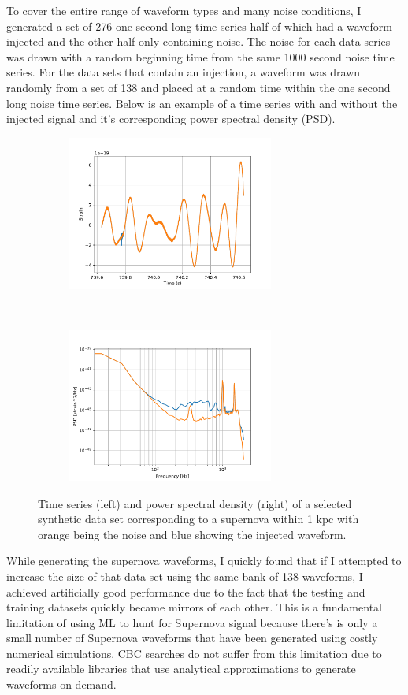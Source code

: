 \documentclass{article}
\begin{document}
To cover the entire range of waveform types and many noise conditions, I generated a set of 276 one second long time series half of which had a waveform injected and the other half only containing noise. The noise for each data series was drawn with a random beginning time from the same 1000 second noise time series. For the data sets that contain an injection, a waveform was drawn randomly from a set of 138 and placed at a random time within the one second long noise time series.  Below is an example of a time series with and without the injected signal and it's corresponding power spectral density (PSD).

\begin{figure}[h!]
    \centering
    \begin{subfigure}[t]{0.5\textwidth}
        \centering
        \includegraphics[height=2in]{TimeSeries.pdf}
    \end{subfigure}%
    ~ 
    \begin{subfigure}[t]{0.5\textwidth}
        \centering
        \includegraphics[height=2in]{PSD.pdf}
    \end{subfigure}
    \caption{Time series (left) and power spectral density (right) of a selected synthetic data set corresponding to a supernova within 1 kpc with orange being the noise and blue showing the injected waveform. }
\end{figure}

While generating the supernova waveforms, I quickly found that if I attempted to increase the size of that data set using the same bank of 138 waveforms, I achieved artificially good performance due to the fact that the testing and training datasets quickly became mirrors of each other. This is a fundamental limitation of using ML to hunt for Supernova signal because there's is only a small number of Supernova waveforms that have been generated using costly numerical simulations. CBC searches do not suffer from this limitation due to readily available libraries that use analytical approximations to generate waveforms on demand.
\end{document}
